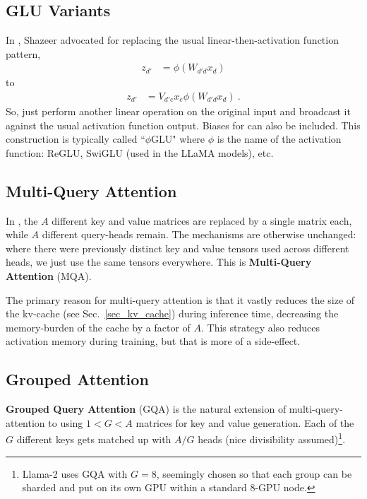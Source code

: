 \subsection{GLU Variants\label{subsec_glu_variants}}

In \cite{shazeer2020gluvariantsimprovetransformer}, Shazeer advocated for replacing the usual
linear-then-activation function pattern,
\begin{align}
    z _{ d' } &= \phi \left  ( W _{ d' d } x _{ d } \right  )
\end{align}
to
\begin{align}
    z _{ d' } &=V _{ d'e }x _{ e } \phi \left ( W _{ d' d } x _{ d } \right  ) \ .
\end{align}
So, just perform another linear operation on the original input and broadcast it against the usual
activation function output. Biases for can also be included. This construction is typically called
``$ \phi $GLU" where $ \phi $ is the name of the activation function: ReGLU, SwiGLU (used in the
LLaMA models), etc.

\subsection{Multi-Query Attention \label{subsec_multi_query_attn}}

In \cite{shazeer2019fast}, the $ A $ different key and value matrices are replaced by a single
matrix each, while $ A$ different query-heads remain. The mechanisms are otherwise unchanged: where
there were previously distinct key and value tensors used across different heads, we just use the same
tensors everywhere. This is \textbf{Multi-Query Attention} (MQA).


The primary reason for multi-query attention is that it vastly reduces the size of the kv-cache (see
Sec.~\ref{sec_kv_cache}) during inference time, decreasing the memory-burden of the cache by a
factor of $ A $. This strategy also reduces activation memory during training, but that is more of a
side-effect.

\subsection{Grouped Attention \label{subsec_grouped_attn}}

\textbf{Grouped Query Attention} (GQA) \cite{ainslie2023gqa} is the natural extension of
multi-query-attention to using $ 1<G<A $ matrices for key and value generation. Each of the $G$
different keys gets matched up with $A/G$ heads (nice divisibility assumed)\footnote{Llama-2
    \cite{touvron2023llama2} uses GQA with $ G=8 $, seemingly chosen so that each group can be
sharded and put on its own GPU within a standard 8-GPU node.}.


